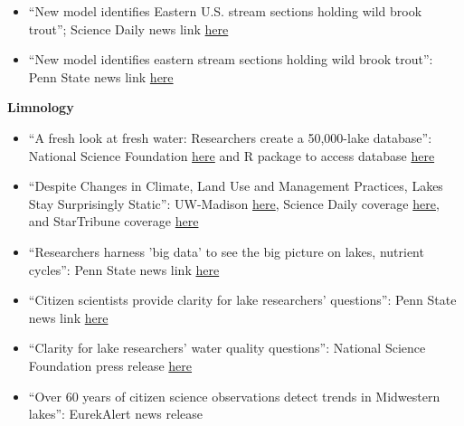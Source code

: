 \documentclass[10pt]{article}
\begin{document}
\begin{flushleft}
\begin{itemize}
\item ``New model identifies Eastern U.S. stream sections holding wild brook trout''; Science Daily news link \href{http://www.sciencedaily.com/releases/2015/01/150106154610.htm}{here}\\
\item ``New model identifies eastern stream sections holding wild brook trout'': Penn State news link
\href{http://news.psu.edu/story/339640/2015/01/06/research/new-model-identifies-eastern-stream-sections-holding-wild-brook}{here}\\
\vspace{5pt}
\end{itemize}
\textbf{Limnology}\\
\begin{itemize}
\item ``A fresh look at fresh water: Researchers create a 50,000-lake database'': National Science Foundation \href{https://www.nsf.gov/news/news_summ.jsp?cntn_id=243391&org=NSF&from=news}{here} and R package to access database \href{https://github.com/cont-limno/LAGOSNE}{here} 
\item ``Despite Changes in Climate, Land Use and Management Practices, Lakes Stay Surprisingly Static'': UW-Madison  \href{http://blog.limnology.wisc.edu/despite-changes-in-climate-land-use-and-management-practices-lakes-stay-surprisingly-static/}{here}, Science Daily coverage  \href{https://www.sciencedaily.com/releases/2017/08/170823184403.htm}{here}, and StarTribune coverage \href{http://m.startribune.com/minnesota-lakes-holding-their-own-against-pollution/441820303/?section=local}{here}
\item ``Researchers harness 'big data' to see the big picture on lakes, nutrient cycles'': Penn State news link \href{http://news.psu.edu/story/425689/2016/09/13/research/researchers-harness-big-data-see-big-picture-lakes-nutrient-cycles}{here}\\
\item ``Citizen scientists provide clarity for lake researchers' questions'': Penn State news link
\href{http://news.psu.edu/story/314178/2014/04/30/research/citizen-scientists-provide-clarity-lake-researchers-questions}{here} \\
\item ``Clarity for lake researchers' water quality questions'': National Science Foundation press release
\href{http://www.nsf.gov/discoveries/disc_summ.jsp?cntn_id=131238&org=NSF&from=news}{here} \\
\item ``Over 60 years of citizen science observations detect trends in Midwestern lakes'': EurekAlert news release

\end{itemize}
\end{flushleft}
\end{document}
